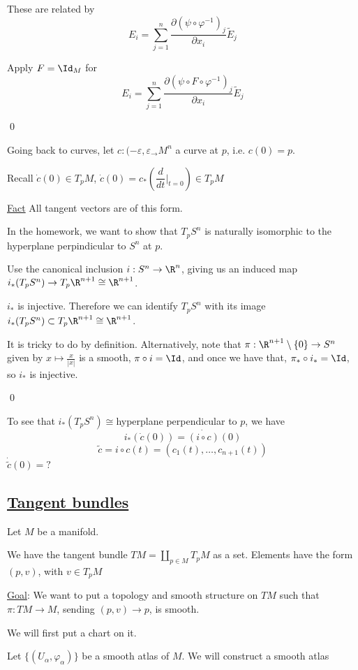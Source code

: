 \documentclass[x11names,reqno,14pt]{extarticle}
\newcommand{\pp}[2]{\dfrac{\partial #1}{\partial #2}}
\newcommand{\dd}[2]{\dfrac{d#1}{d#2}}
\renewcommand{\phi}{\varphi}
\begin{document}
These are related by 
\[
E_i = \sum_{j=1}^n \pp{(\psi\circ\phi^{-1})_j}{x_i} \tilde{E}_j
\]

\proof

Apply $F = \Id_M$ for 
\[
E_i = \sum_{j=1}^n\pp{(\psi\circ F \circ\phi^{-1})_j}{x_i}\tilde{E}_j
\]

\qed

Going back to curves, let $c:(-\varepsilon,\varepsilon_\to M^n$ a curve at $p$, i.e. $c(0) = p$. 

Recall $\dot{c}(0) \in T_pM$, $\dot{c}(0) = c_*(\dd{}{t}|_{t=0})\in T_pM$

\underline{Fact} All tangent vectors are of this form.

In the homework, we want to show that $T_pS^n$ is naturally isomorphic to the hyperplane perpindicular to $S^n$ at $p$. 

Use the canonical inclusion $i:S^n\to \R^n$, giving us an induced map $i_*(T_pS^n)\to T_p\R^{n + 1} \cong \R^{n + 1}$. 

\claim

$i_*$ is injective. Therefore we can identify $T_pS^n$ with its image $i_*(T_pS^n) \subset T_p\R^{n + 1} \cong \R^{n + 1}$.

\proof

It is tricky to do by definition. Alternatively, note that $\pi:\R^{n + 1}\setminus\{0\} \to S^n$ given by $x\mapsto\frac{x}{|x|}$ is a smooth, $\pi\circ i = \Id$, and once we have that, $\pi_*\circ i_* = \Id$, so $i_*$ is injective.

\qed

To see that $i_*(T_pS^n) \cong $hyperplane perpendicular to $p$, we have
\[
i_*(\dot{c}(0)) = \dot{(i\circ c)}(0)
\]
\[
\tilde{c} = i\circ c(t) = (c_1(t), \dots, c_{n + 1}(t))
\]
$\dot{\tilde{c}}(0) = ?$

\subsection*{\underline{Tangent bundles}}

Let $M$ be a manifold. 

We have the tangent bundle $TM = \coprod_{p\in M}T_pM$ as a set. Elements have the form $(p, v)$, with $v \in T_pM$ 

\underline{Goal}: We want to put a topology and smooth structure on $TM$ such that $\pi:TM\to M$, sending $(p, v) \to p$, is smooth.

We will first put a chart on it. 

Let $\{(U_\alpha,\phi_\alpha)\}$ be a smooth atlas of $M$. We will construct a smooth atlas 
\end{document}
